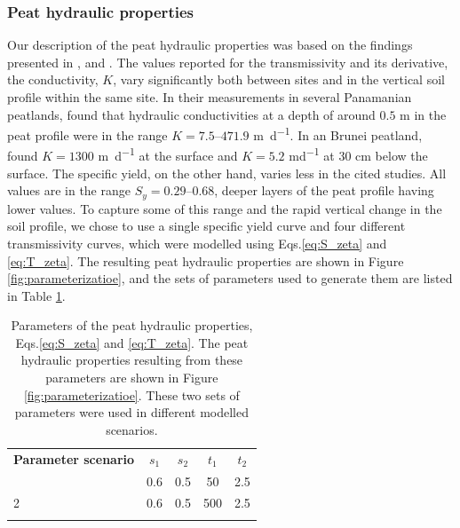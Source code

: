 \documentclass[bg, manuscript]{copernicus}
\begin{document}
\subsubsection{Peat hydraulic properties}
Our description of the peat hydraulic properties was based on the findings presented in \cite{cobbHowTemporalPatterns2017}, \cite{hooijerHydrologyTropicalWetland2005} and \cite{bairdHighPermeabilityExplains2017}.
The values reported for the transmissivity and its derivative, the conductivity, $K$, vary significantly both between sites and in the vertical soil profile within the same site.
In their measurements in several Panamanian peatlands, \cite{bairdHighPermeabilityExplains2017} found  that hydraulic conductivities at a depth of around $0.5$ \unit{m} in the peat profile were in the range $K = 7.5\text{--}471.9$ \unit{m d^{-1}}.
In an Brunei peatland, \cite{cobbHowTemporalPatterns2017} found $K = 1300$ \unit{m d^{-1}} at the surface and $K = 5.2$ \unit{md^{-1}} at $30$ \unit{cm} below the surface.
The specific yield, on the other hand, varies less in the cited studies.
All values are in the range $S_y=0.29\text{--}0.68$, deeper layers of the peat profile having lower values.
To capture some of this range and the rapid vertical change in the soil profile, we chose to use a single specific yield curve and  four different transmissivity curves, which were modelled using Eqs.\eqref{eq:S_zeta} and \eqref{eq:T_zeta}.
The resulting peat hydraulic properties are shown in Figure \ref{fig:parameterizatioe}, and the sets of parameters used to generate them are listed in Table \ref{tab:peat_property_params}.

\begin{table}[t]
\caption{Parameters of the peat hydraulic properties, Eqs.\eqref{eq:S_zeta} and \eqref{eq:T_zeta}. The peat hydraulic properties resulting from these parameters are shown in Figure \ref{fig:parameterizatioe}. These two sets of parameters were used in different modelled scenarios.}
\label{tab:peat_property_params} 
\begin{tabular}{lcccc}
\tophline
\textbf{Parameter scenario} & \textbf{$s_1$} & \textbf{$s_2$} &	\textbf{$t_1$} & \textbf{$t_2$}  \\
\middlehline
1 & 0.6 & 0.5 & 50 & 2.5 \\
2 & 0.6 & 0.5 & 500 & 2.5 \\
\bottomhline
\end{tabular}
\end{table}
\end{document}
